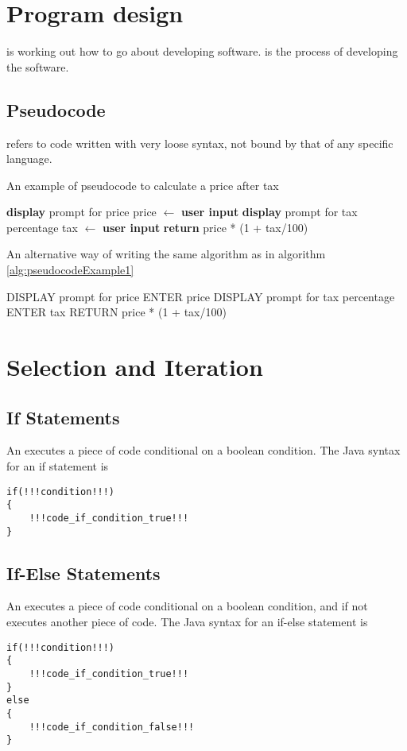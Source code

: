 \documentclass[11pt]{report}
\begin{document}
\pagebreak
\section{Program design}
\begin{defi}
     is working out how to go about developing software.  is the process of developing the software.
\end{defi}
\subsection{Pseudocode}
 refers to code written with very loose syntax, not bound by that of any specific language.
\begin{algorithm}
    \caption{An example of pseudocode to calculate a price after tax}
    \label{alg:pseudocodeExample1}
    \textbf{display} prompt for price\;
    price $\gets$ \textbf{user input}\;
    \textbf{display} prompt for tax percentage\;
    tax $\gets$ \textbf{user input}\;
    \textbf{return} price * (1 + tax/100)\;
\end{algorithm}
\begin{algorithm}
    \caption{An alternative way of writing the same algorithm as in algorithm \ref{alg:pseudocodeExample1}}
    DISPLAY prompt for price\;
    ENTER price\;
    DISPLAY prompt for tax percentage\;
    ENTER tax\;
    RETURN price * (1 + tax/100)\;
\end{algorithm}
\pagebreak


\section{Selection and Iteration}
\subsection{If Statements}
An  executes a piece of code conditional on a boolean condition. The Java syntax for an if statement is
\vspace{-20pt}
\begin{lstlisting}[style=javaSyntax]
if(!!!condition!!!)
{
    !!!code_if_condition_true!!!
}
\end{lstlisting}
\subsection{If-Else Statements}
An  executes a piece of code conditional on a boolean condition, and if not executes another piece of code. The Java syntax for an if-else statement is
\vspace{-20pt}
\begin{lstlisting}[style=javaSyntax]
if(!!!condition!!!)
{
    !!!code_if_condition_true!!!
}
else
{
    !!!code_if_condition_false!!!
}
\end{lstlisting}
\end{document}
